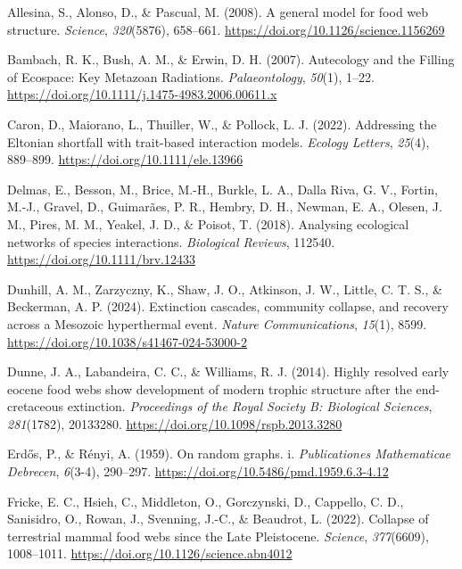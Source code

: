 \documentclass[
]{article}
\newlength{\cslhangindent}
\newenvironment{CSLReferences}[2] %
 {\begin{list}{}{%
  \setlength{\itemindent}{0pt}
  \setlength{\leftmargin}{0pt}
  \setlength{\parsep}{0pt}
  \ifodd #1
   \setlength{\leftmargin}{\cslhangindent}
   \setlength{\itemindent}{-1\cslhangindent}
  \fi
  \setlength{\itemsep}{#2\baselineskip}}}
 {\end{list}}
\begin{document}
\label{refs}
\begin{CSLReferences}{1}{0}
Allesina, S., Alonso, D., \& Pascual, M. (2008). A general model for
food web structure. \emph{Science}, \emph{320}(5876), 658--661.
\url{https://doi.org/10.1126/science.1156269}

Bambach, R. K., Bush, A. M., \& Erwin, D. H. (2007). Autecology and the
Filling of Ecospace: Key Metazoan Radiations. \emph{Palaeontology},
\emph{50}(1), 1--22.
\url{https://doi.org/10.1111/j.1475-4983.2006.00611.x}

Caron, D., Maiorano, L., Thuiller, W., \& Pollock, L. J. (2022).
Addressing the Eltonian shortfall with trait-based interaction models.
\emph{Ecology Letters}, \emph{25}(4), 889--899.
\url{https://doi.org/10.1111/ele.13966}

Delmas, E., Besson, M., Brice, M.-H., Burkle, L. A., Dalla Riva, G. V.,
Fortin, M.-J., Gravel, D., Guimarães, P. R., Hembry, D. H., Newman, E.
A., Olesen, J. M., Pires, M. M., Yeakel, J. D., \& Poisot, T. (2018).
Analysing ecological networks of species interactions. \emph{Biological
Reviews}, 112540. \url{https://doi.org/10.1111/brv.12433}

Dunhill, A. M., Zarzyczny, K., Shaw, J. O., Atkinson, J. W., Little, C.
T. S., \& Beckerman, A. P. (2024). Extinction cascades, community
collapse, and recovery across a Mesozoic hyperthermal event.
\emph{Nature Communications}, \emph{15}(1), 8599.
\url{https://doi.org/10.1038/s41467-024-53000-2}

Dunne, J. A., Labandeira, C. C., \& Williams, R. J. (2014). Highly
resolved early eocene food webs show development of modern trophic
structure after the end-cretaceous extinction. \emph{Proceedings of the
Royal Society B: Biological Sciences}, \emph{281}(1782), 20133280.
\url{https://doi.org/10.1098/rspb.2013.3280}

Erdős, P., \& Rényi, A. (1959). On random graphs. i. \emph{Publicationes
Mathematicae Debrecen}, \emph{6}(3-4), 290--297.
\url{https://doi.org/10.5486/pmd.1959.6.3-4.12}

Fricke, E. C., Hsieh, C., Middleton, O., Gorczynski, D., Cappello, C.
D., Sanisidro, O., Rowan, J., Svenning, J.-C., \& Beaudrot, L. (2022).
Collapse of terrestrial mammal food webs since the Late Pleistocene.
\emph{Science}, \emph{377}(6609), 1008--1011.
\url{https://doi.org/10.1126/science.abn4012}


\end{CSLReferences}
\end{document}
